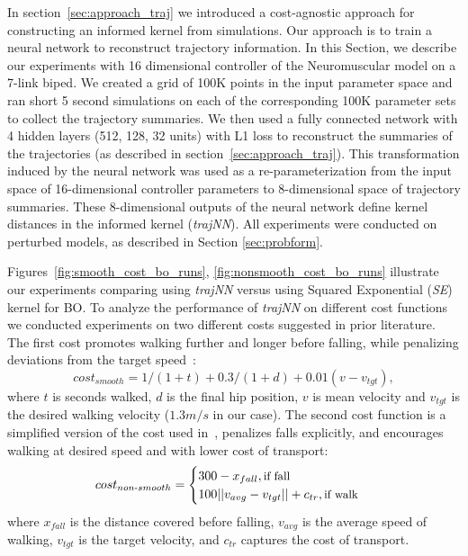 In section~\ref{sec:approach_traj} we introduced a cost-agnostic approach for constructing an informed kernel from simulations. Our approach is to train a neural network to reconstruct trajectory information. In this Section, we describe our experiments with 16 dimensional controller of the Neuromuscular model on a 7-link biped. We created a grid of 100K points in the input parameter space  and ran short 5 second simulations on each of the corresponding 100K parameter sets to collect the trajectory summaries. We then used a fully connected network with 4 hidden layers (512, 128, 32 units) with L1 loss to reconstruct the summaries of the trajectories (as described in section~\ref{sec:approach_traj}). This transformation induced by the neural network was used as a re-parameterization from the input space of 16-dimensional controller parameters to 8-dimensional space of trajectory summaries. These 8-dimensional outputs of the neural network define kernel distances in the informed kernel (\textit{trajNN}). All experiments were conducted on perturbed models, as described in Section \ref{sec:probform}.

Figures~\ref{fig:smooth_cost_bo_runs}, \ref{fig:nonsmooth_cost_bo_runs} illustrate our experiments comparing using \textit{trajNN} versus using Squared Exponential (\textit{SE}) kernel for BO. To analyze the performance of \textit{trajNN} on different cost functions we conducted experiments on two different costs suggested in prior literature. The first cost promotes walking further and longer before falling, while penalizing deviations from the target speed~\citep{rai2016sample}:
\begin{equation}
cost_{smooth} = 1/(1+t) + 0.3/(1+d) + 0.01(v-v_{tgt}),
\label{eq:cost_smooth}
\end{equation}
where $t$ is seconds walked, $d$ is the final hip position, $v$ is mean velocity and $v_{tgt}$ is the desired walking velocity ($1.3m/s$ in our case). 
The second cost function is a simplified version of the cost used in~\cite{song2015neural}, penalizes falls explicitly, and encourages walking at desired speed and with lower cost of transport:
\begin{equation}
cost_{non\text{-}smooth} = 		
    \begin{cases}
		300 - x_{fall} , \text{\small{if fall}} \\
		100 ||v_{avg} - v_{tgt}|| + c_{tr}, \text{\small{if walk}}\\
	\end{cases}
\label{eq:cost_nonsmooth}
\end{equation}
where $x_{fall}$ is the distance covered before falling, $v_{avg}$ is the average speed of walking, $v_{tgt}$ is the target velocity, and $c_{tr}$ captures the cost of transport.

